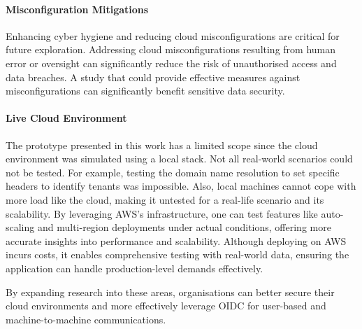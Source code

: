      \paragraph{Misconfiguration Mitigations} Enhancing cyber hygiene and reducing cloud misconfigurations are critical for future exploration. Addressing cloud misconfigurations resulting from human error or oversight can significantly reduce the risk of unauthorised access and data breaches. A study that could provide effective measures against misconfigurations can significantly benefit sensitive data security.

     \paragraph{Live Cloud Environment} The prototype presented in this work has a limited scope since the cloud environment was simulated using a local stack. Not all real-world scenarios could not be tested. For example, testing the domain name resolution to set specific headers to identify tenants was impossible. Also, local machines cannot cope with more load like the cloud, making it untested for a real-life scenario and its scalability. By leveraging AWS's infrastructure, one can test features like auto-scaling and multi-region deployments under actual conditions, offering more accurate insights into performance and scalability. Although deploying on AWS incurs costs, it enables comprehensive testing with real-world data, ensuring the application can handle production-level demands effectively.

\newline
By expanding research into these areas, organisations can better secure their cloud environments and more effectively leverage OIDC for user-based and machine-to-machine communications.


